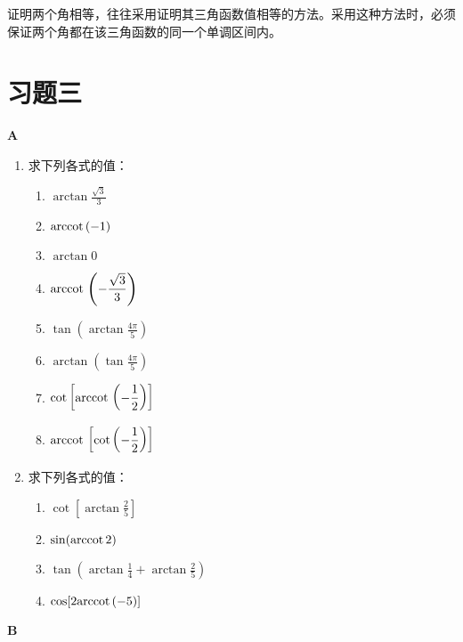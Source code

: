 \begin{remark}
 证明两个角相等，往往采用证明其三角函数值相等的方法。采用这种方法时，必须保证两个角都在该三角函数的同一个单调区间内。
\end{remark}


\section*{习题三}
\begin{center}
    \bfseries A
\end{center}

\begin{enumerate}
    \item 求下列各式的值： 
\begin{multicols}{2}
\begin{enumerate}[(1)]
    \item $\arctan \frac{\sqrt{3}}{3}$
    \item ${\rm arccot\,} (-1)$
    \item $\arctan 0$
    \item ${\rm arccot\,} \left(-\dfrac{\sqrt{3}}{3}\right)$
    \item $\tan \left(\arctan\frac{4\pi}{5}\right)$
    \item $\arctan \left(\tan\frac{4\pi}{5}\right)$
    \item $\cot\left[{\rm arccot\,} \left(-\dfrac{1}{2}\right)\right] $
    \item ${\rm arccot\,}\left[\cot\left(-\dfrac{1}{2}\right)\right] $
\end{enumerate}
\end{multicols}
    \item 求下列各式的值： 
\begin{multicols}{2}
\begin{enumerate}[(1)]
    \item $\cot\left[\arctan\frac{2}{5}\right] $
    \item $\sin({\rm arccot\,} 2)$
    \item $\tan\left(\arctan\frac{1}{4}+\arctan\frac{2}{5}\right) $
    \item $\cos[2{\rm arccot\,} (-5)]$
\end{enumerate}
\end{multicols}
\end{enumerate}

\begin{center}
    \bfseries B
\end{center}

